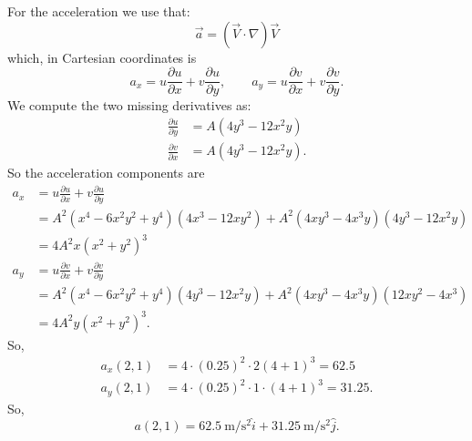 \begin{derivation}
   For the acceleration we use that:
   \begin{equation*}
     \Vec{a} = (\Vec{V} \cdot \nabla ) \Vec{V}
   \end{equation*}
   which, in Cartesian coordinates is
   \begin{equation*}
     a_x = u \frac{\partial u}{\partial x} + v \frac{\partial u}{\partial y}, \qquad a_y = u \frac{\partial v}{\partial x} + v \frac{\partial v}{\partial y} 
   .\end{equation*}
   We compute the two missing derivatives as:
   \begin{align*}
     \frac{\partial u}{\partial y} &= A \left( 4 y^3 - 12 x^2 y \right) \\
     \frac{\partial v}{\partial x} &= A \left( 4y^3 - 12x^2 y \right)
   .\end{align*}
   So the acceleration components are
   \begin{align*}
     a_x &= u \frac{\partial u}{\partial x} + v \frac{\partial u}{\partial y}  \\
     &= A^2 \left( x^{4} - 6 x^2 y^2 + y^{4} \right) \left( 4 x^3 - 12 x y^2 \right) + A^2 \left( 4 x y^3 - 4 x^3 y \right) \left( 4 y^3 - 12 x^2 y \right) \\
     &=4 A^2 x \left(x^2+y^2\right)^3\\
     a_y &= u \frac{\partial v}{\partial x} + v \frac{\partial v}{\partial y}  \\
     &= A^2 \left( x^{4} - 6 x^2 y^2 + y^{4} \right) \left( 4 y^3 - 12 x^2 y \right) + A^2 \left( 4 x y^3 - 4 x^3 y \right) \left( 12 x y^2 - 4 x^3 \right) \\
     &= 4 A^2 y \left(x^2+y^2\right)^3
   .\end{align*}
   So,
   \begin{align*}
     a_x(2,1) &= 4 \cdot \left( \num{0,25}  \right)^2 \cdot 2 \left( 4 + 1  \right)^3 = 62.5 \\
     a_y(2,1) &= 4 \cdot \left( \num{0,25} \right)^2 \cdot 1\cdot  \left( 4 + 1 \right)^3    = 31.25
   .\end{align*}
   So,
   \begin{equation*}
     a(2,1) = \qty{62,5}{\m\per\s^2} \hat{i} + \qty{31,25}{\m\per\s^2} \hat{j}
   .\end{equation*}
\end{derivation}


